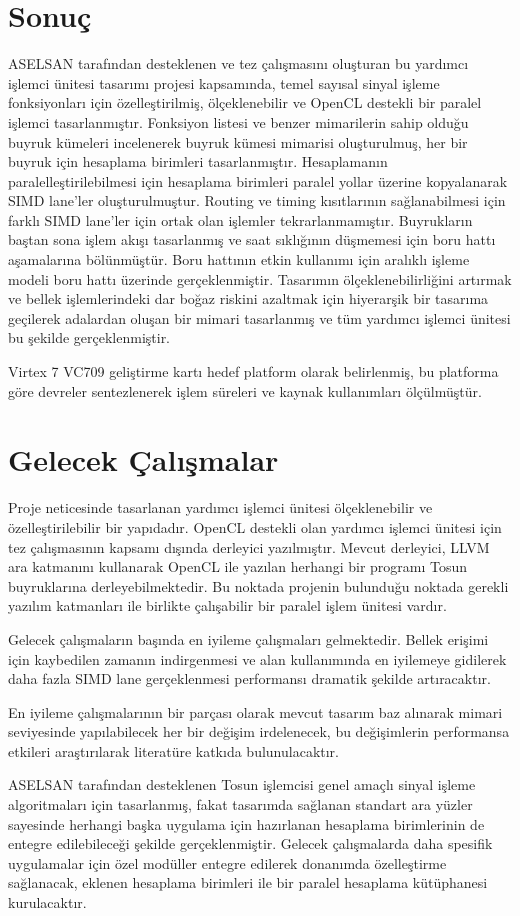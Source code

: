 \section{Sonuç}
ASELSAN tarafından desteklenen ve tez çalışmasını oluşturan bu yardımcı işlemci ünitesi tasarımı projesi kapsamında, temel sayısal sinyal işleme fonksiyonları için özelleştirilmiş, ölçeklenebilir ve OpenCL destekli bir paralel işlemci tasarlanmıştır. Fonksiyon listesi ve benzer mimarilerin sahip olduğu buyruk kümeleri incelenerek buyruk kümesi mimarisi oluşturulmuş, her bir buyruk için hesaplama birimleri tasarlanmıştır. Hesaplamanın paralelleştirilebilmesi için hesaplama birimleri paralel yollar üzerine kopyalanarak SIMD lane'ler oluşturulmuştur. Routing ve timing kısıtlarının sağlanabilmesi için farklı SIMD lane'ler için ortak olan işlemler tekrarlanmamıştır. Buyrukların baştan sona işlem akışı tasarlanmış ve saat sıklığının düşmemesi için boru hattı aşamalarına bölünmüştür. Boru hattının etkin kullanımı için aralıklı işleme modeli boru hattı üzerinde gerçeklenmiştir. Tasarımın ölçeklenebilirliğini artırmak ve bellek işlemlerindeki dar boğaz riskini azaltmak için hiyerarşik bir tasarıma geçilerek adalardan oluşan bir mimari tasarlanmış ve tüm yardımcı işlemci ünitesi bu şekilde gerçeklenmiştir. \par

Virtex 7 VC709 geliştirme kartı hedef platform olarak belirlenmiş, bu platforma göre devreler sentezlenerek işlem süreleri ve kaynak kullanımları ölçülmüştür.

\section{Gelecek Çalışmalar}
Proje neticesinde tasarlanan yardımcı işlemci ünitesi ölçeklenebilir ve özelleştirilebilir bir yapıdadır. OpenCL destekli olan yardımcı işlemci ünitesi için tez çalışmasının kapsamı dışında derleyici yazılmıştır. Mevcut derleyici, LLVM ara katmanını kullanarak OpenCL ile yazılan herhangi bir programı Tosun buyruklarına derleyebilmektedir. Bu noktada projenin bulunduğu noktada gerekli yazılım katmanları ile birlikte çalışabilir bir paralel işlem ünitesi vardır.\par
Gelecek çalışmaların başında en iyileme çalışmaları gelmektedir. Bellek erişimi için kaybedilen zamanın indirgenmesi ve alan kullanımında en iyilemeye gidilerek daha fazla SIMD lane gerçeklenmesi performansı dramatik şekilde artıracaktır. \par
En iyileme çalışmalarının bir parçası olarak mevcut tasarım baz alınarak mimari seviyesinde yapılabilecek her bir değişim irdelenecek, bu değişimlerin performansa etkileri araştırılarak literatüre katkıda bulunulacaktır. \par
ASELSAN tarafından desteklenen Tosun işlemcisi genel amaçlı sinyal işleme algoritmaları için tasarlanmış, fakat tasarımda sağlanan standart ara yüzler sayesinde herhangi başka uygulama için hazırlanan hesaplama birimlerinin de entegre edilebileceği şekilde gerçeklenmiştir. Gelecek çalışmalarda daha spesifik uygulamalar için özel modüller entegre edilerek donanımda özelleştirme sağlanacak, eklenen hesaplama birimleri ile bir paralel hesaplama kütüphanesi kurulacaktır.  